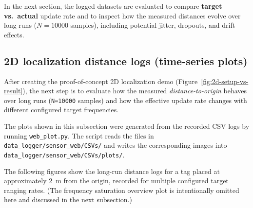 \documentclass[a4paper,11pt]{article}
\begin{document}
In the next section, the logged datasets are evaluated to compare \textbf{target vs.\ actual}
update rate and to inspect how the measured distances evolve over long runs
(\(N=10000\) samples), including potential jitter, dropouts, and drift effects.

	\subsection{2D localization distance logs (time-series plots)}
	\label{subsec:2d-localization-logs-results}
	
	After creating the proof-of-concept 2D localization demo (Figure~\ref{fig:2d-setup-vs-result}),
	the next step is to evaluate how the measured \emph{distance-to-origin} behaves over long runs
	(\texttt{N=10000} samples) and how the effective update rate changes with different configured
	target frequencies.
	
	\begin{tcolorbox}[title=Note (plot generation),
		colback=accentlight!60!white,
		sharp corners]
		The plots shown in this subsection were generated from the recorded CSV logs by running
		\texttt{web\_plot.py}. The script reads the files in
		\texttt{data\_logger/sensor\_web/CSVs/} and writes the corresponding images into
		\texttt{data\_logger/sensor\_web/CSVs/plots/}.
	\end{tcolorbox}
	
	The following figures show the long-run distance logs for a tag placed at approximately \SI{2}{m}
	from the origin, recorded for multiple configured target ranging rates. (The frequency saturation
	overview plot is intentionally omitted here and discussed in the next subsection.)
	
\end{document}
